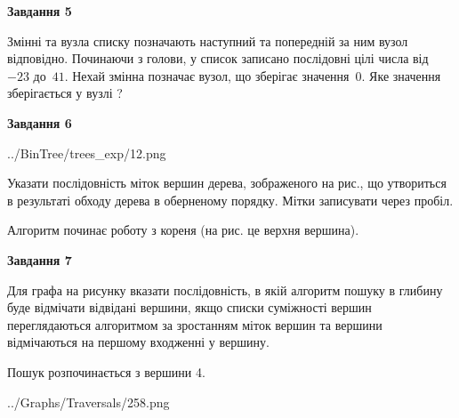 \documentclass[12pt, ukrainian]{article}
\begin{document}
{\begin {large}
{\begin {center}\textbf{Завдання 5}\end {center}}\par
Змінні  та  вузла списку позначають наступний та попередній за ним вузол відповідно. Починаючи з голови, у список записано послідовні цілі числа від~$-23$ до~$41$. Нехай змінна  позначає вузол, що зберігає значення~$0$.
Яке значення зберігається у вузлі  ?\par
\newpage

{\begin {center}\textbf{Завдання 6}\end {center}}\par

\begin{center}
	{../BinTree/trees_exp/12.png}
\end{center}
Указати послідовність міток вершин дерева, зображеного на рис., що утвориться в результаті обходу дерева в оберненому порядку. Мітки записувати через пробіл.\par Алгоритм починає роботу з кореня (на рис. це верхня вершина).\par
\newpage

{\begin {center}\textbf{Завдання 7}\end {center}}\par
Для графа на рисунку вказати послідовність, в якій алгоритм пошуку в глибину буде відмічати відвідані вершини, якщо списки суміжності вершин переглядаються алгоритмом за зростанням міток вершин та вершини відмічаються на першому вход\-женні у вершину.\par
Пошук розпочинається з вершини 4.\par

\begin{center}
	{../Graphs/Traversals/258.png}
\end{center}\par
\newpage


\end{large}}
\end{document}
